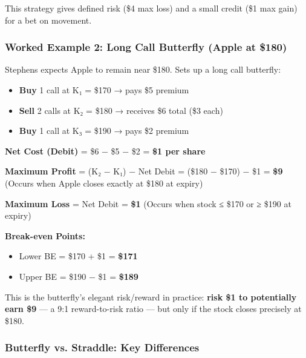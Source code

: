 \documentclass[12pt,openany]{book}
\begin{document}
This strategy gives defined risk (\$4 max loss) and a small credit (\$1 max gain) for a bet on movement.



\subsubsection{Worked Example 2: Long Call Butterfly (Apple at \$180)}

Stephens expects Apple to remain near \$180. Sets up a long call butterfly:
\begin{itemize}[leftmargin=*]
    \item \textbf{Buy} 1 call at K₁ = \$170 → pays \$5 premium
    \item \textbf{Sell} 2 calls at K₂ = \$180 → receives \$6 total (\$3 each)
    \item \textbf{Buy} 1 call at K₃ = \$190 → pays \$2 premium
\end{itemize}

\textbf{Net Cost (Debit)} = \$6 − \$5 − \$2 = \textbf{\$1 per share}

\textbf{Maximum Profit} = (K₂ − K₁) − Net Debit = (\$180 − \$170) − \$1 = \textbf{\$9}
(Occurs when Apple closes exactly at \$180 at expiry)

\textbf{Maximum Loss} = Net Debit = \textbf{\$1}
(Occurs when stock ≤ \$170 or ≥ \$190 at expiry)

\textbf{Break-even Points:}
\begin{itemize}[leftmargin=*]
    \item Lower BE = \$170 + \$1 = \textbf{\$171}
    \item Upper BE = \$190 − \$1 = \textbf{\$189}
\end{itemize}

This is the butterfly's elegant risk/reward in practice: \textbf{risk \$1 to potentially earn \$9} — a 9:1 reward-to-risk ratio — but only if the stock closes precisely at \$180.



\subsubsection{Butterfly vs. Straddle: Key Differences}
\end{document}

